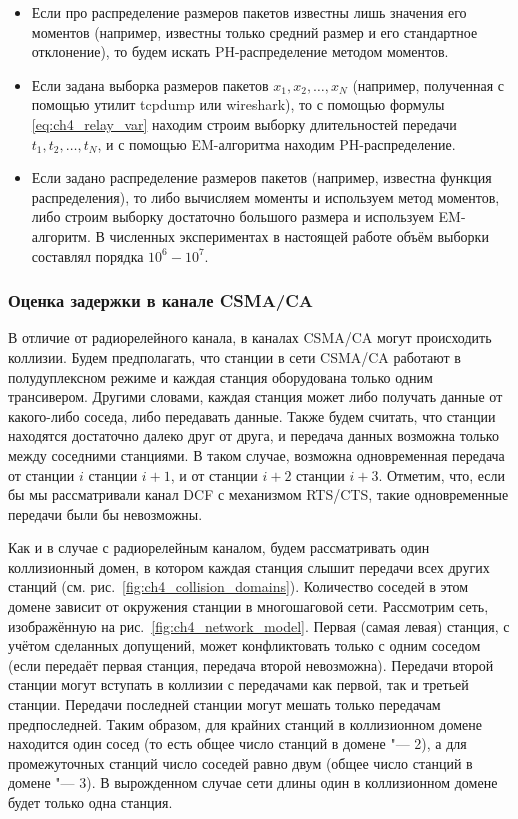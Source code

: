 \begin{itemize}
\item Если про распределение размеров пакетов известны лишь значения его моментов (например, известны только средний размер и его стандартное отклонение), то будем искать PH-распределение методом моментов.
\item Если задана выборка размеров пакетов $x_1, x_2, \dots, x_N$ (например, полученная с помощью утилит tcpdump или wireshark), то с помощью формулы \eqref{eq:ch4_relay_var} находим строим выборку длительностей передачи $t_1, t_2, \dots, t_N$, и с помощью EM-алгоритма находим PH-распределение.
\item Если задано распределение размеров пакетов (например, известна функция распределения), то либо вычисляем моменты и используем метод моментов, либо строим выборку достаточно большого размера и используем EM-алгоритм. В численных экспериментах в настоящей работе объём выборки составлял порядка $10^6-10^7$.
\end{itemize}




\subsubsection{Оценка задержки в канале CSMA/CA}

В отличие от радиорелейного канала, в каналах CSMA/CA могут происходить коллизии. Будем предполагать, что станции в сети CSMA/CA работают в полудуплексном режиме и каждая станция оборудована только одним трансивером. Другими словами, каждая станция может либо получать данные от какого-либо соседа, либо передавать данные. Также будем считать, что станции находятся достаточно далеко друг от друга, и передача данных возможна только между соседними станциями. В таком случае, возможна одновременная передача от станции $i$ станции $i + 1$, и от станции $i + 2$ станции $i + 3$. Отметим, что, если бы мы рассматривали канал DCF с механизмом RTS/CTS, такие одновременные передачи были бы невозможны.

Как и в случае с радиорелейным каналом, будем рассматривать один коллизионный домен, в котором каждая станция слышит передачи всех других станций (см. рис.~\ref{fig:ch4_collision_domains}). Количество соседей в этом домене зависит от окружения станции в многошаговой сети. Рассмотрим сеть, изображённую на рис.~\ref{fig:ch4_network_model}. Первая (самая левая) станция, с учётом сделанных допущений, может конфликтовать только с одним соседом (если передаёт первая станция, передача второй невозможна). Передачи второй станции могут вступать в коллизии с передачами как первой, так и третьей станции. Передачи последней станции могут мешать только передачам предпоследней. Таким образом, для крайних станций в коллизионном домене находится один сосед (то есть общее число станций в домене "--- 2), а для промежуточных станций число соседей равно двум (общее число станций в домене "--- 3). В вырожденном случае сети длины один в коллизионном домене будет только одна станция.

